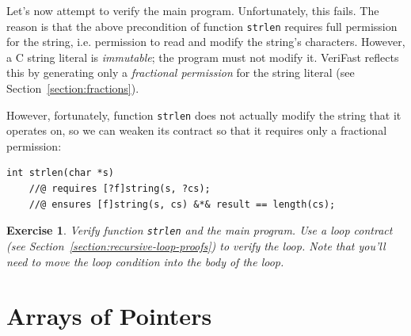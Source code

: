 \documentclass{article}
\newtheorem{exercise}{Exercise}
\begin{document}
Let's now attempt to verify the main program. Unfortunately,
this fails. The reason is that the above precondition of
function \lstinline!strlen! requires full permission for the
string, i.e. permission to read and modify the string's
characters. However, a C string literal is \emph{immutable};
the program must not modify it. VeriFast reflects this by
generating only a \emph{fractional permission} for the string
literal (see Section~\ref{section:fractions}).

However, fortunately, function \lstinline!strlen! does not
actually modify the string that it operates on, so we can
weaken its contract so that it requires only a fractional
permission:
\begin{lstlisting}
int strlen(char *s)
    //@ requires [?f]string(s, ?cs);
    //@ ensures [f]string(s, cs) &*& result == length(cs);
\end{lstlisting}

\begin{exercise}\label{exercise:strlen}
Verify function \lstinline!strlen! and the main program. Use a
loop contract (see Section~\ref{section:recursive-loop-proofs})
to verify the loop. Note that you'll need to move the loop
condition into the body of the loop.
\end{exercise}

\section{Arrays of Pointers}\label{section:arrays-of-pointers}
\end{document}
